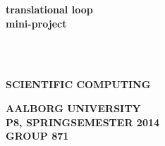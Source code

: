 \begin{center}
	\vspace*{4cm}
	
	\begin{huge}
		\textbf{ \textcolor{verydarkblue}{translational loop\\
                \bigskip
                mini-project}}
	\end{huge}\\~\\
	\vspace{-2mm}
    \begin{small}
	\textbf{SCIENTIFIC COMPUTING}
	\vspace*{2cm}
    \end{small}		
		

	\vspace*{12cm}
   	\begin{small}
	\textbf{AALBORG UNIVERSITY\\
	\smallskip
	P8, SPRINGSEMESTER 2014\\
	GROUP 871}
	\end{small}

\end{center}
